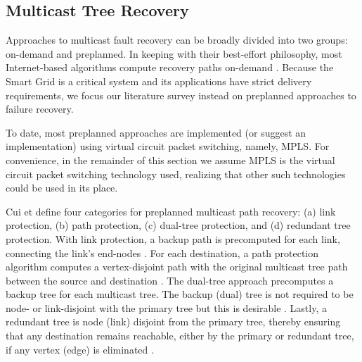 
\subsection{Multicast Tree Recovery}


Approaches to multicast fault recovery can be broadly divided into two groups: on-demand and preplanned. 
In keeping with their best-effort philosophy, most Internet-based algorithms compute recovery paths on-demand \cite{Cui04}. 
Because the Smart Grid is a critical system and its applications have strict delivery requirements, we focus our literature survey instead on preplanned approaches to failure recovery. 
 
To date, most preplanned approaches \cite{Cui04,Fei01,Medard99,Pointurier02,Wu97} are implemented (or suggest an implementation) using 
virtual circuit packet switching, namely, MPLS. 
For convenience, in the remainder of this section we assume MPLS is the virtual circuit packet switching technology used, realizing that other such technologies could be used in its place.

Cui et \cite{Cui04} define four categories for preplanned multicast path recovery: (a) link protection, (b) path protection, (c) dual-tree protection, and (d) redundant tree protection.
With link protection, a backup path is precomputed for each link, connecting the link's end-nodes \cite{Pointurier02,Wu97}. 
For each destination, a path protection algorithm computes a vertex-disjoint path with the original multicast tree path between the source and destination \cite{Wu97}. 
The dual-tree approach precomputes a backup tree for each multicast tree. The backup (dual) tree is not required to be node- or link-disjoint with the primary tree but this is 
desirable \cite{Fei01,Tam09}. Lastly, a redundant tree is node (link) disjoint from the primary tree, thereby ensuring that any destination
remains reachable, either by the primary or redundant tree, if any vertex (edge) is eliminated \cite{Medard99}.  




